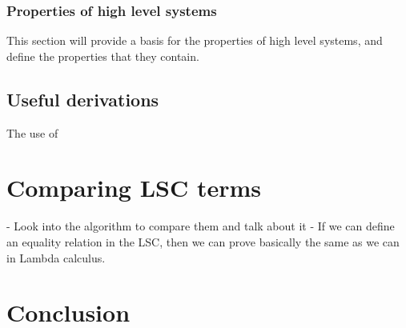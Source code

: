 \documentclass[12pt]{article}
\begin{document}
\subsubsection{Properties of high level systems}
This section will provide a basis for the properties of high level systems, and define the properties that they contain.
\subsection{Useful derivations}
The use of
\section{Comparing LSC terms}
- Look into the algorithm to compare them and talk about it
- If we can define an equality relation in the LSC, then we can prove basically the same as we can in Lambda calculus.
\section{Conclusion}
\printbibliography
\end{document}
